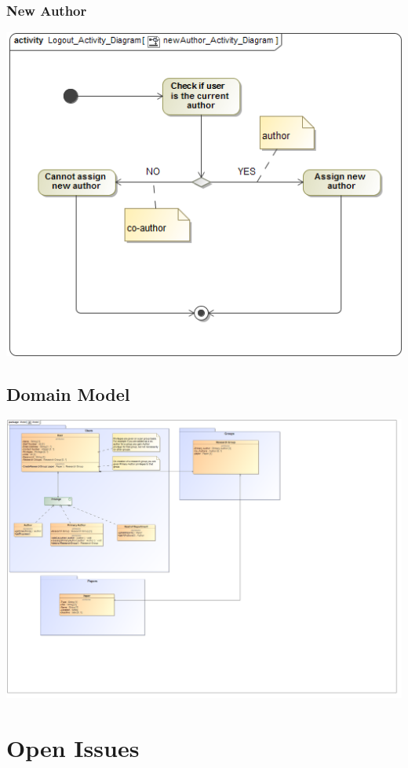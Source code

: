 \documentclass[11pt]{article}
\begin{document}
	\newpage
	\subsubsection{New Author}
	\begin{center}
		\includegraphics[width=\textwidth]{../Images/newAuthor_Activity_Diagram.png}\\[0.5cm]
	\end{center}
	
	\subsection{Domain Model}
	\begin{center}
		\includegraphics[width=\textwidth]{../Images/DomainModel.png}\\[0.5cm]
	\end{center}
	
	\section{Open Issues}
	
	\newpage
	
	{}
	
\end{document}
